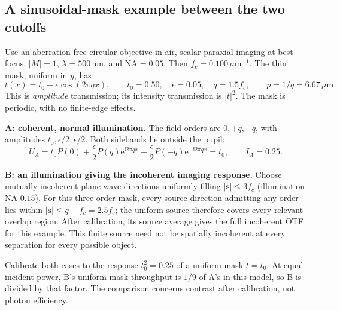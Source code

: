 \documentclass[11pt,a4paper]{article}
\numberwithin{equation}{section}
\newcommand{\ii}{\mathrm{i}}
\newcommand{\ee}{\mathrm{e}}
\newcommand{\vct}[1]{\bm{#1}}
\newcommand{\NA}{\mathrm{NA}}
\newcommand{\nm}{\,\mathrm{nm}}
\newcommand{\um}{\,\mu\mathrm m}
\newcommand{\keep}[1]{\par\smallskip{\color{rust}\textbf{Keep distinct.}} #1\par\smallskip}
\begin{document}

\FloatBarrier
\subsection{A sinusoidal-mask example between the two cutoffs}
Use an aberration-free circular objective in air, scalar paraxial imaging
at best focus, $|M|=1$, $\lambda=500\nm$, and $\NA=0.05$. Then
$f_c=0.100\,\mu\mathrm m^{-1}$. The thin mask, uniform in $y$, has
\begin{equation}
t(x)=t_0+\epsilon\cos(2\pi qx),\qquad
t_0=0.50,\quad\epsilon=0.05,\quad q=1.5f_c,
\qquad p=1/q=6.67\um.
\label{eq:sinusoid}
\end{equation}
This is \emph{amplitude} transmission; its intensity transmission is
$|t|^2$. The mask is periodic, with no finite-edge effects.

\textbf{A: coherent, normal illumination.}
The field orders are $0,+q,-q$, with amplitudes
$t_0,\epsilon/2,\epsilon/2$. Both sidebands lie outside the pupil:
\begin{equation}
U_A=t_0P(0)+\frac\epsilon2P(q)\ee^{\ii2\pi qx}
+\frac\epsilon2P(-q)\ee^{-\ii2\pi qx}=t_0,
\qquad \boxed{I_A=0.25.}
\end{equation}

\textbf{B: an illumination giving the incoherent imaging response.}
Choose mutually incoherent plane-wave directions uniformly filling
$|\vct s|\leq3f_c$ (illumination NA $0.15$). For this three-order mask,
every source direction admitting any order lies within
$|\vct s|\leq q+f_c=2.5f_c$; the uniform source therefore covers every
relevant overlap region. After calibration, its source average gives
the full incoherent OTF for this example. This finite source need not
be spatially incoherent at every separation for every possible object.

Calibrate both cases to the response $t_0^2=0.25$ of a uniform mask
$t=t_0$. At equal incident power, B's uniform-mask throughput is $1/9$
of A's in this model, so B is divided by that factor. The comparison
concerns contrast after calibration, not photon efficiency.
\end{document}
